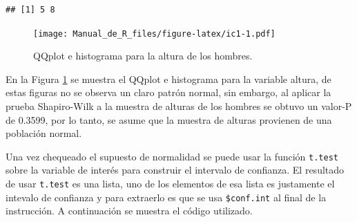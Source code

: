 \documentclass[10pt,]{krantz}
\makeatletter
\newenvironment{Shaded}{\begin{snugshade}}{\end{snugshade}}
\newcommand{\KeywordTok}[1]{\textcolor[rgb]{0.13,0.29,0.53}{\textbf{#1}}}
\newcommand{\DataTypeTok}[1]{\textcolor[rgb]{0.13,0.29,0.53}{#1}}
\newcommand{\DecValTok}[1]{\textcolor[rgb]{0.00,0.00,0.81}{#1}}
\newcommand{\StringTok}[1]{\textcolor[rgb]{0.31,0.60,0.02}{#1}}
\newcommand{\CommentTok}[1]{\textcolor[rgb]{0.56,0.35,0.01}{\textit{#1}}}
\newcommand{\OtherTok}[1]{\textcolor[rgb]{0.56,0.35,0.01}{#1}}
\newcommand{\OperatorTok}[1]{\textcolor[rgb]{0.81,0.36,0.00}{\textbf{#1}}}
\newcommand{\NormalTok}[1]{#1}
\newenvironment{kframe}{%
\medskip{}
\setlength{\fboxsep}{.8em}
 \def\at@end@of@kframe{}%
 \ifinner\ifhmode%
  \def\at@end@of@kframe{\end{minipage}}%
  \begin{minipage}{\columnwidth}%
 \fi\fi%
 \def\FrameCommand##1{\hskip\@totalleftmargin \hskip-\fboxsep
 \colorbox{shadecolor}{##1}\hskip-\fboxsep
     \hskip-\linewidth \hskip-\@totalleftmargin \hskip\columnwidth}%
 \MakeFramed {\advance\hsize-\width
   \@totalleftmargin\z@ \linewidth\hsize
   \@setminipage}}%
 {\par\unskip\endMakeFramed%
 \at@end@of@kframe}
\renewenvironment{Shaded}{\begin{kframe}}{\end{kframe}}
\makeatother
\begin{document}
\begin{Shaded}
\end{Shaded}

\begin{verbatim}
## [1] 5 8
\end{verbatim}

\begin{Shaded}
\end{Shaded}

\begin{figure}
\centering
\texttt{[image: Manual\_de\_R\_files/figure-latex/ic1-1.pdf]}
\caption{\label{fig:ic1}QQplot e histograma para la altura de los hombres.}
\end{figure}

En la Figura \ref{fig:ic1} se muestra el QQplot e histograma para la
variable altura, de estas figuras no se observa un claro patrón normal,
sin embargo, al aplicar la prueba Shapiro-Wilk a la muestra de alturas
de los hombres se obtuvo un valor-P de 0.3599, por lo tanto, se asume
que la muestra de alturas provienen de una población normal.

Una vez chequeado el supuesto de normalidad se puede usar la función
\texttt{t.test} sobre la variable de interés para construir el intervalo
de confianza. El resultado de usar \texttt{t.test} es una lista, uno de
los elementos de esa lista es justamente el intevalo de confianza y para
extraerlo es que se usa \texttt{\$conf.int} al final de la instrucción.
A continuación se muestra el código utilizado.
\end{document}
